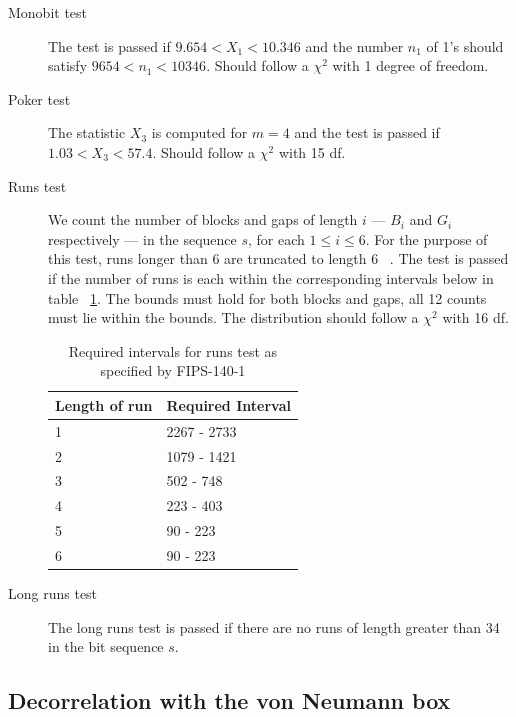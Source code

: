 \documentclass[a4paper]{article}           %
\begin{document}
\begin{description}
\item[Monobit test] The test is passed if $9.654 < X_1 < 10.346$ and the number $n_1$ of 1's should satisfy $9654 < n_1 < 10346$. Should follow a $\chi^2$ with 1 degree of freedom. 
\item[Poker test] The statistic $X_3$ is computed for $m=4$ and the test is passed if $1.03 < X_3 < 57.4$. Should follow a $\chi^2$ with 15 df. 
\item [Runs test] We count the number of blocks and gaps of length $i$ --- $B_i$ and $G_i$ respectively --- in the sequence $s$, for each $1 \leq i \leq 6$. For the purpose of this test, runs longer than 6 are truncated to length 6 ~\cite{fips140}. The test is passed if the number of runs is each within the corresponding intervals below in table ~\ref{tab:fipsbounds}. The bounds must hold for both blocks and gaps, all 12 counts must lie within the bounds. The distribution should follow a $\chi^2$ with 16 df. 

  \begin{table}[H]
    \begin{center}
      \begin{tabular}{| l | l |}
        \hline
        Length of run & Required Interval \\
        \hline
        \hline
        1 & 2267 - 2733 \\
        2 & 1079 - 1421 \\
        3 & 502 - 748 \\
        4 & 223 - 403 \\
        5 & 90 - 223 \\
        6 & 90 - 223 \\
        \hline
      \end{tabular}
    \end{center}
    \caption{Required intervals for runs test as specified by FIPS-140-1}
    \label{tab:fipsbounds}
  \end{table}

\item[Long runs test] The long runs test is passed if there are no runs of length greater than 34 in the bit sequence $s$. 
\end{description}

\subsection{Decorrelation with the von Neumann box}
\end{document}
